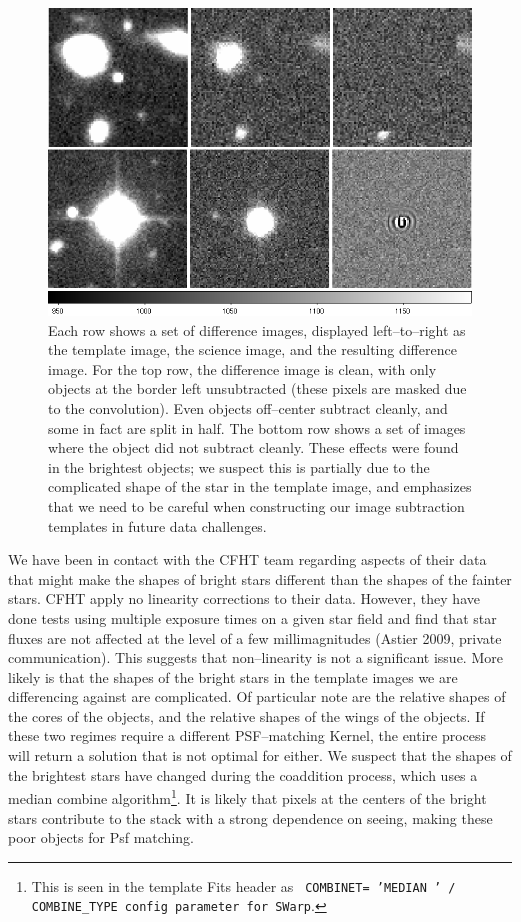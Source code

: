 \begin{figure}[htp]
\centering
\includegraphics[width=6in]{images/diffim.png}
\caption[Example difference images.]
{ Each row shows a set of difference images, displayed left--to--right
as the template image, the science image, and the resulting difference
image.  For the top row, the difference image is clean, with only
objects at the border left unsubtracted (these pixels are masked due
to the convolution).  Even objects off--center subtract cleanly, and
some in fact are split in half.  The bottom row shows a set of images
where the object did not subtract cleanly.  These effects were found
in the brightest objects; we suspect this is partially due to the
complicated shape of the star in the template image, and emphasizes
that we need to be careful when constructing our image subtraction
templates in future data challenges.  }
\label{fig:diffim}
\end{figure}

We have been in contact with the CFHT team regarding aspects of their
data that might make the shapes of bright stars different than the
shapes of the fainter stars.  CFHT apply no linearity corrections to
their data.  However, they have done tests using multiple exposure
times on a given star field and find that star fluxes are not affected
at the level of a few millimagnitudes (Astier 2009, private
communication).  This suggests that non--linearity is not a
significant issue.  More likely is that the shapes of the bright stars
in the template images we are differencing against are complicated.
Of particular note are the relative shapes of the cores of the
objects, and the relative shapes of the wings of the objects.  If
these two regimes require a different PSF--matching Kernel, the entire
process will return a solution that is not optimal for either.  We
suspect that the shapes of the brightest stars have changed during the
coaddition process, which uses a median combine
algorithm\footnote{This is seen in the template Fits header as {\tt
COMBINET= 'MEDIAN ' / COMBINE\_TYPE config parameter for SWarp}.}.  It
is likely that pixels at the centers of the bright stars contribute to
the stack with a strong dependence on seeing, making these poor
objects for Psf matching.

